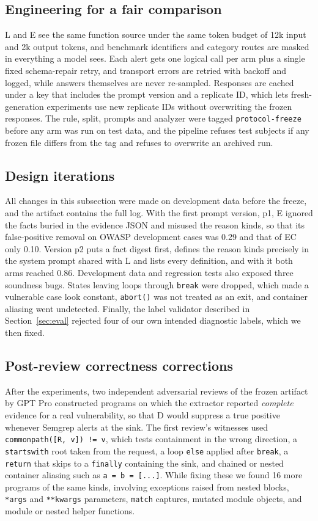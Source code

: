 \subsection{Engineering for a fair comparison}
L and E see the same function source under the same token budget of 12k input and 2k output tokens, and benchmark identifiers and category routes are masked in everything a model sees. Each alert gets one logical call per arm plus a single fixed schema-repair retry, and transport errors are retried with backoff and logged, while answers themselves are never re-sampled. Responses are cached under a key that includes the prompt version and a replicate ID, which lets fresh-generation experiments use new replicate IDs without overwriting the frozen responses. The rule, split, prompts and analyzer were tagged \texttt{protocol-freeze} before any arm was run on test data, and the pipeline refuses test subjects if any frozen file differs from the tag and refuses to overwrite an archived run.

\subsection{Design iterations}
All changes in this subsection were made on development data before the freeze, and the artifact contains the full log. With the first prompt version, p1, E ignored the facts buried in the evidence JSON and misused the reason kinds, so that its false-positive removal on OWASP development cases was 0.29 and that of EC only 0.10. Version p2 puts a fact digest first, defines the reason kinds precisely in the system prompt shared with L and lists every definition, and with it both arms reached 0.86. Development data and regression tests also exposed three soundness bugs. States leaving loops through \texttt{break} were dropped, which made a vulnerable case look constant, \texttt{abort()} was not treated as an exit, and container aliasing went undetected. Finally, the label validator described in Section~\ref{sec:eval} rejected four of our own intended diagnostic labels, which we then fixed.

\subsection{Post-review correctness corrections}
\label{sec:correction}
After the experiments, two independent adversarial reviews of the frozen artifact by GPT Pro constructed programs on which the extractor reported \emph{complete} evidence for a real vulnerability, so that D would suppress a true positive whenever Semgrep alerts at the sink. The first review's witnesses used \texttt{commonpath([R, v]) != v}, which tests containment in the wrong direction, a \texttt{startswith} root taken from the request, a loop \texttt{else} applied after \texttt{break}, a \texttt{return} that skips to a \texttt{finally} containing the sink, and chained or nested container aliasing such as \texttt{a = b = [...]}. While fixing these we found 16 more programs of the same kinds, involving exceptions raised from nested blocks, \texttt{*args} and \texttt{**kwargs} parameters, \texttt{match} captures, mutated module objects, and module or nested helper functions.

